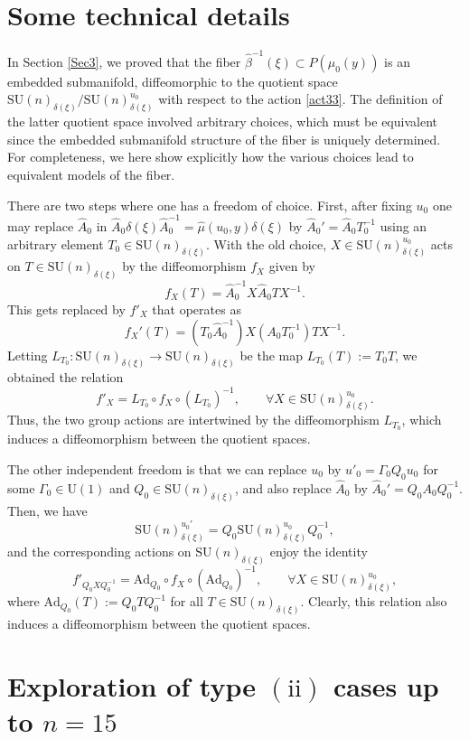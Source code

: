 \documentclass[a4paper,11pt,reqno]{amsart}
\theoremstyle{definition}
\numberwithin{equation}{section}
\newcommand{\be}{\begin{equation}}
\newcommand{\ee}{\end{equation}}
\def\SU{\mathrm{SU}}                        %
\def\Ad{\mathrm{Ad}}                        %
\def\U{\mathrm{U}}                          %
\begin{document}
\section{Some technical details}\label{AppB}

In Section \ref{Sec3}, we proved that the fiber $\hat \beta^{-1}(\xi) \subset P(\mu_0(y))$ is an embedded submanifold,
diffeomorphic to the quotient space $\SU(n)_{\delta(\xi)}/ \SU(n)_{\delta(\xi)}^{u_0}$ with respect to the action \eqref{act33}.
The definition of the latter quotient space involved arbitrary choices, which
must be equivalent since the embedded submanifold structure of the fiber is uniquely determined.
For completeness, we here show explicitly how the various choices lead to equivalent models of the fiber.

There are two steps where one has a freedom of choice. First, after fixing $u_0$ one may replace
$\hat A_0$ in $\hat A_0 \delta(\xi) \hat A_0^{-1} = \hat \mu(u_0,y) \delta(\xi)$
 by $\hat A_0' = \hat A_0 T_0^{-1}$ using an arbitrary element $T_0 \in \SU(n)_{\delta(\xi)}$.
With the old choice, $X \in \SU(n)_{\delta(\xi)}^{u_0}$ acts on $T\in \SU(n)_{\delta(\xi)}$ by the
diffeomorphism $f_X$ given by
\be
f_X(T) = \hat A_0^{-1}  X \hat A_0 T X^{-1}.
\ee
This gets replaced by $f'_X$ that operates as
\be
f_X'(T) = (T_0  \hat A_0^{-1})  X (A_0  T_0^{-1})  T  X^{-1}.
\ee
Letting  $L_{T_0}: \SU(n)_{\delta(\xi)} \to \SU(n)_{\delta(\xi)}$ be the map $L_{T_0}(T) := T_0 T$,
we obtained the relation
\be
 f'_X = L_{T_0} \circ f_X \circ (L_{T_0})^{-1}, \qquad \forall X \in \SU(n)_{\delta(\xi)}^{u_0}.
 \ee
Thus, the two group actions are intertwined by the diffeomorphism $L_{T_0}$, which induces
a diffeomorphism between the quotient spaces.


The other independent freedom is that we can  replace $u_0$ by $u'_0 = \Gamma_0 Q_0 u_0$ for some $\Gamma_0 \in \U(1)$ and
$Q_0\in \SU(n)_{\delta(\xi)}$, and also replace $\hat A_0$ by $\hat A_0' = Q_0 A_0 Q_0^{-1}$.
Then, we have
\be
\SU(n)_{\delta(\xi)}^{u_0'} = Q_0 \SU(n)_{\delta(\xi)}^{u_0} Q_0^{-1},
\ee
and the corresponding actions on $\SU(n)_{\delta(\xi)}$ enjoy the identity
\be
f'_{Q_0 X Q_0^{-1}} = \Ad_{Q_0} \circ f_X \circ (\Ad_{Q_0})^{-1}, \qquad \forall  X \in \SU(n)_{\delta(\xi)}^{u_0},
\ee
where $\Ad_{Q_0}(T) := Q_0 T Q_0^{-1}$ for all $T\in \SU(n)_{\delta(\xi)}$.
Clearly, this relation also induces a diffeomorphism between the quotient spaces.

\section{Exploration of type $\mathrm{(ii)}$ cases up to $n=15$}\label{AppC}
\end{document}
